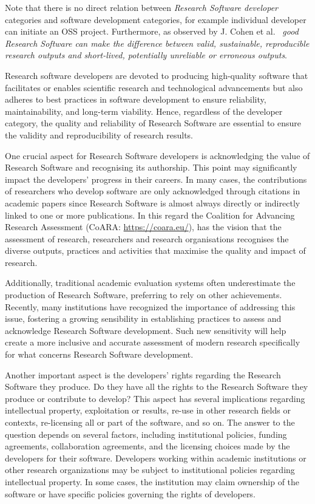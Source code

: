 Note that there is no direct relation between \textit{Research Software developer} categories and software development categories, for example individual developer can initiate an OSS project. Furthermore, as observed by J. Cohen et al.~\cite{TheFourPillarsOfRSE_2021} \textit{good Research Software can make the difference between valid, sustainable, reproducible research outputs and short-lived, potentially unreliable or erroneous outputs}.

Research software developers are devoted to producing high-quality software that facilitates or enables scientific research and technological advancements but also adheres to best practices in software development to ensure reliability, maintainability, and long-term viability. Hence, regardless of the developer category, the quality and reliability of Research Software are essential to ensure the validity and reproducibility of research results.

One crucial aspect for Research Software developers is acknowledging the value of Research Software and recognising its authorship. This point may significantly impact the developers' progress in their careers. In many cases, the contributions of researchers who develop software are only acknowledged through citations in academic papers since Research Software is almost always directly or indirectly linked to one or more publications. In this regard the Coalition for Advancing Research Assessment (CoARA: \url{https://coara.eu/}), has the vision that the assessment of research, researchers and research organisations recognises the diverse outputs, practices and activities that maximise the quality and impact of research. 

Additionally, traditional academic evaluation systems often underestimate the production of Research Software, preferring to rely on other achievements. Recently, many institutions have recognized the importance of addressing this issue, fostering a growing sensibility in establishing practices to assess and acknowledge Research Software development. Such new sensitivity will help create a more inclusive and accurate assessment of modern research specifically for what concerns Research Software development.

Another important aspect is the developers' rights regarding the Research Software they produce. Do they have all the rights to the Research Software they produce or contribute to develop? This aspect has several implications regarding intellectual property, exploitation or results, re-use in other research fields or contexts, re-licensing all or part of the software, and so on. The answer to the question depends on several factors, including institutional policies, funding agreements, collaboration agreements, and the licensing choices made by the developers for their software. Developers working within academic institutions or other research organizations may be subject to institutional policies regarding intellectual property. In some cases, the institution may claim ownership of the software or have specific policies governing the rights of developers.


